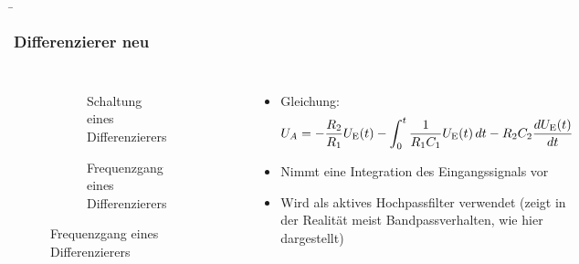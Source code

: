 \begin{frame}
    \b{
    \frametitle{Differenzierer neu}
    \begin{columns}
        \centering
        \begin{figure}
    \centering

    \begin{subfigure}{\linewidth}
        \centering
        \resizebox{0.6\linewidth}{!}{}
        \caption{Schaltung eines Differenzierers}
    \end{subfigure}

    \vspace{0.5cm} 

    \begin{subfigure}{\linewidth}
        \centering
        \resizebox{0.6\linewidth}{!}{}
        \caption{Frequenzgang eines Differenzierers}
    \end{subfigure}

\end{figure}

        \raggedleft
        \begin{itemize}
            \item Gleichung:
           \[
     U_A = - \frac{R_2}{R_1} U_{\textnormal{E}}(t) \\
        - \int_0^t \frac{1}{R_1 C_1} U_{\textnormal{E}}(t) \, dt 
        - R_2 C_2\frac{dU_{\textnormal{E}}(t)}{dt}
     \]
        \item Nimmt eine Integration des Eingangssignals vor
        \item Wird als aktives Hochpassfilter verwendet (zeigt in der Realität meist Bandpassverhalten, wie hier dargestellt)  
    \end{itemize}
    \end{columns}
    }
\end{frame}


